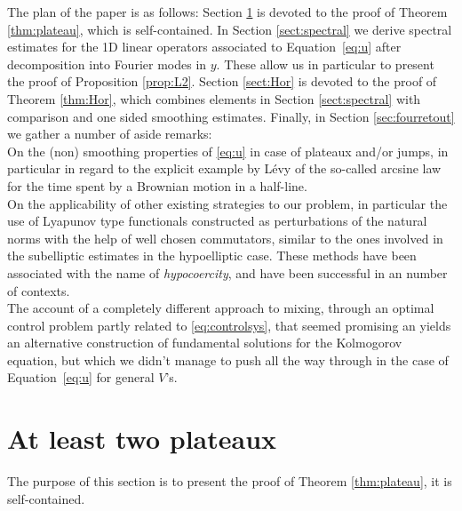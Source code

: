 \documentclass[12pt]{article}
\begin{document}
\medskip

The plan of the paper is as follows: Section \ref{sect:plateau} is devoted to the 
proof of Theorem \ref{thm:plateau}, which is self-contained. 
In Section \ref{sect:spectral} we derive spectral estimates for the 1D linear 
operators associated to Equation~\eqref{eq:u} 
after decomposition into Fourier modes in $y$. These allow us in particular to 
present the proof of Proposition \ref{prop:L2}. Section \ref{sect:Hor} is devoted to
the proof of Theorem \ref{thm:Hor}, which combines elements in Section
\ref{sect:spectral} with comparison and one sided smoothing estimates.  Finally, in
Section \ref{sec:fourretout} we gather a number of aside remarks:\\
 On the 
(non) smoothing properties of \eqref{eq:u} in case of plateaux and/or jumps, in
particular in regard to the explicit example by Lévy \cite{Levy39} of the so-called 
arcsine law for the time spent by a Brownian motion in a half-line.\\
 On the
applicability of other existing strategies to our problem, in particular 
the use of Lyapunov type functionals constructed as perturbations of the natural
norms with the help of well chosen commutators, similar to the ones involved in 
the subelliptic estimates in the hypoelliptic case. These methods have been associated with 
the name of {\it hypocoercity}, and have been successful in an number of 
contexts.\\
The account of a completely different approach to mixing, through an optimal 
control problem partly related to \eqref{eq:controlsys}, that seemed promising 
an yields an alternative construction of fundamental solutions for the 
Kolmogorov equation, but which we didn't manage to push all the way through in 
the case of Equation~\eqref{eq:u} for general $V$'s. 



\section{At least two plateaux}\label{sect:plateau}

The purpose of this section is to present the proof of Theorem
\ref{thm:plateau}, it is self-contained.
\end{document}
